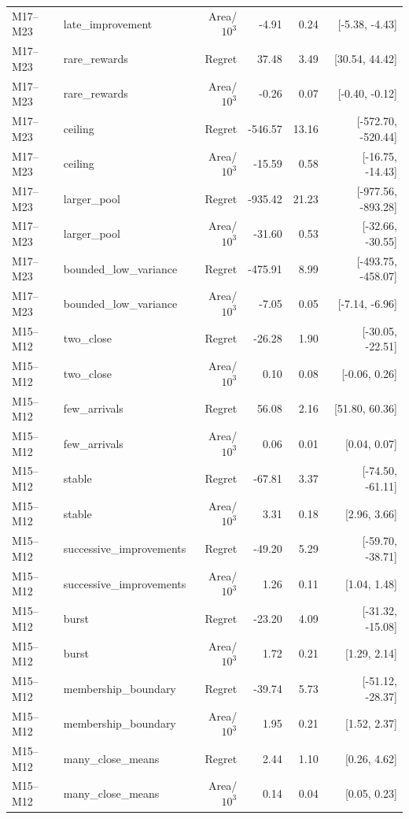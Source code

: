 \documentclass[11pt]{article}
\theoremstyle{remark}
\begin{document}
\begin{longtable}{llrrrr}
M17--M23 & late\_improvement & Area/$10^3$ & -4.91 & 0.24 & [-5.38, -4.43] \\
M17--M23 & rare\_rewards & Regret & 37.48 & 3.49 & [30.54, 44.42] \\
M17--M23 & rare\_rewards & Area/$10^3$ & -0.26 & 0.07 & [-0.40, -0.12] \\
M17--M23 & ceiling & Regret & -546.57 & 13.16 & [-572.70, -520.44] \\
M17--M23 & ceiling & Area/$10^3$ & -15.59 & 0.58 & [-16.75, -14.43] \\
M17--M23 & larger\_pool & Regret & -935.42 & 21.23 & [-977.56, -893.28] \\
M17--M23 & larger\_pool & Area/$10^3$ & -31.60 & 0.53 & [-32.66, -30.55] \\
M17--M23 & bounded\_low\_variance & Regret & -475.91 & 8.99 & [-493.75, -458.07] \\
M17--M23 & bounded\_low\_variance & Area/$10^3$ & -7.05 & 0.05 & [-7.14, -6.96] \\
M15--M12 & two\_close & Regret & -26.28 & 1.90 & [-30.05, -22.51] \\
M15--M12 & two\_close & Area/$10^3$ & 0.10 & 0.08 & [-0.06, 0.26] \\
M15--M12 & few\_arrivals & Regret & 56.08 & 2.16 & [51.80, 60.36] \\
M15--M12 & few\_arrivals & Area/$10^3$ & 0.06 & 0.01 & [0.04, 0.07] \\
M15--M12 & stable & Regret & -67.81 & 3.37 & [-74.50, -61.11] \\
M15--M12 & stable & Area/$10^3$ & 3.31 & 0.18 & [2.96, 3.66] \\
M15--M12 & successive\_improvements & Regret & -49.20 & 5.29 & [-59.70, -38.71] \\
M15--M12 & successive\_improvements & Area/$10^3$ & 1.26 & 0.11 & [1.04, 1.48] \\
M15--M12 & burst & Regret & -23.20 & 4.09 & [-31.32, -15.08] \\
M15--M12 & burst & Area/$10^3$ & 1.72 & 0.21 & [1.29, 2.14] \\
M15--M12 & membership\_boundary & Regret & -39.74 & 5.73 & [-51.12, -28.37] \\
M15--M12 & membership\_boundary & Area/$10^3$ & 1.95 & 0.21 & [1.52, 2.37] \\
M15--M12 & many\_close\_means & Regret & 2.44 & 1.10 & [0.26, 4.62] \\
M15--M12 & many\_close\_means & Area/$10^3$ & 0.14 & 0.04 & [0.05, 0.23] \\

\end{longtable}
\end{document}
